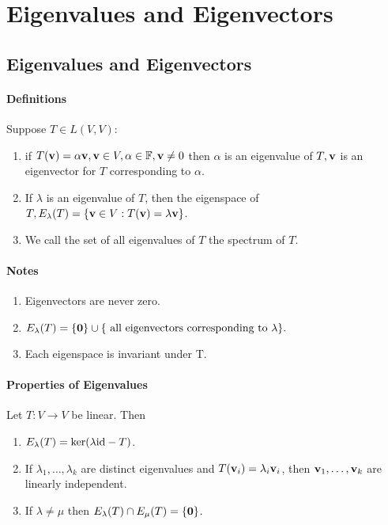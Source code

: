 \section{Eigenvalues and Eigenvectors}

\subsection{Eigenvalues and Eigenvectors}
\paragraph{Definitions}
Suppose \(T \in L(V,V):\)
\begin{enumerate}
    \item if \(T(\mathbf{v}) = \alpha\mathbf{v}, \mathbf{v} \in V, \alpha \in \mathbb{F}, \mathbf{v} \neq 0\) then \(\alpha\) is an eigenvalue of \(T, \mathbf{v}\) is an eigenvector for \(T\) corresponding to \(\alpha\).
    \item If \(\lambda\) is an eigenvalue of \(T\), then the eigenspace of \(T, E_\lambda(T) = \{\mathbf{v} \in V: T(\mathbf{v}) = \lambda\mathbf{v} \}\).
    \item We call the set of all eigenvalues of \(T\) the spectrum of \(T\).
\end{enumerate}

\paragraph{Notes}
\begin{enumerate}
    \item Eigenvectors are never zero.
    \item \(E_\lambda(T) = \{\mathbf{0}\} \cup \{\text{ all eigenvectors corresponding to } \lambda\}.\)
    \item Each eigenspace is invariant under T.
\end{enumerate}

\paragraph{Properties of Eigenvalues}
Let \(T: V \to V\) be linear. Then
\begin{enumerate}
    \item \(E_\lambda(T) = \ker(\lambda\mathrm{id} - T)\).
    \item If \(\lambda_1, \dots, \lambda_k\) are distinct eigenvalues and \(T(\mathbf{v}_i) = \lambda_i\mathbf{v}_i\), then \(\mathbf{v}_1, \dots, \mathbf{v}_k\) are linearly independent.
    \item If \(\lambda \neq \mu\) then \(E_\lambda(T) \cap E_\mu(T) = \{\mathbf{0}\}\).
\end{enumerate}

